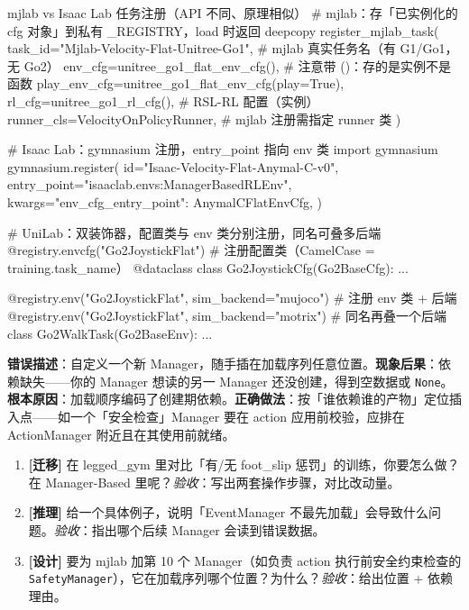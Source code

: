 \begin{codebox}[Python]{mjlab vs Isaac Lab 任务注册（API 不同、原理相似）}
# mjlab：存「已实例化的 cfg 对象」到私有 _REGISTRY，load 时返回 deepcopy
register_mjlab_task(
    task_id="Mjlab-Velocity-Flat-Unitree-Go1",   # mjlab 真实任务名（有 G1/Go1，无 Go2）
    env_cfg=unitree_go1_flat_env_cfg(),          # 注意带 ()：存的是实例不是函数
    play_env_cfg=unitree_go1_flat_env_cfg(play=True),
    rl_cfg=unitree_go1_rl_cfg(),                 # RSL-RL 配置（实例）
    runner_cls=VelocityOnPolicyRunner,           # mjlab 注册需指定 runner 类
)

# Isaac Lab：gymnasium 注册，entry_point 指向 env 类
import gymnasium
gymnasium.register(
    id="Isaac-Velocity-Flat-Anymal-C-v0",
    entry_point="isaaclab.envs:ManagerBasedRLEnv",
    kwargs={"env_cfg_entry_point": AnymalCFlatEnvCfg},
)

# UniLab：双装饰器，配置类与 env 类分别注册，同名可叠多后端
@registry.envcfg("Go2JoystickFlat")            # 注册配置类（CamelCase = training.task_name）
@dataclass
class Go2JoystickCfg(Go2BaseCfg): ...

@registry.env("Go2JoystickFlat", sim_backend="mujoco")   # 注册 env 类 + 后端
@registry.env("Go2JoystickFlat", sim_backend="motrix")   # 同名再叠一个后端
class Go2WalkTask(Go2BaseEnv): ...
\end{codebox}

\begin{pitfall}
\textbf{错误描述}：自定义一个新 Manager，随手插在加载序列任意位置。\textbf{现象后果}：依赖缺失——你的 Manager 想读的另一 Manager 还没创建，得到空数据或 \verb|None|。\textbf{根本原因}：加载顺序编码了创建期依赖。\textbf{正确做法}：按「谁依赖谁的产物」定位插入点——如一个「安全检查」Manager 要在 action 应用前校验，应排在 ActionManager 附近且在其使用前就绪。
\end{pitfall}

\begin{practice}[本节练习]
\begin{enumerate}
  \item \textbf{[迁移]} 在 legged\_gym 里对比「有/无 foot\_slip 惩罚」的训练，你要怎么做？在 Manager-Based 里呢？\emph{验收}：写出两套操作步骤，对比改动量。
  \item \textbf{[推理]} 给一个具体例子，说明「EventManager 不最先加载」会导致什么问题。\emph{验收}：指出哪个后续 Manager 会读到错误数据。
  \item \textbf{[设计]} 要为 mjlab 加第 10 个 Manager（如负责 action 执行前安全约束检查的 \verb|SafetyManager|），它在加载序列哪个位置？为什么？\emph{验收}：给出位置 + 依赖理由。
\end{enumerate}
\end{practice}

